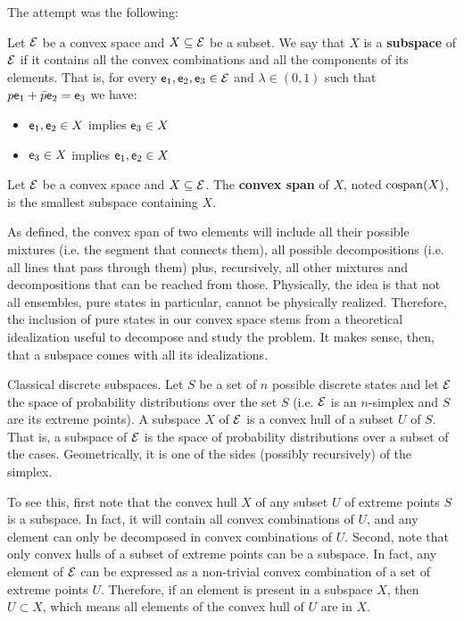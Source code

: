 The attempt was the following:

\begin{defn}
	Let $\mathcal{E}$ be a convex space and $X \subseteq \mathcal{E}$ be a subset. We say that $X$ is a \textbf{subspace} of $\mathcal{E}$ if it contains all the convex combinations and all the components of its elements. That is, for every $\mathsf{e}_1, \mathsf{e}_2, \mathsf{e}_3 \in \mathcal{E}$ and $\lambda \in (0,1)$ such that $p \mathsf{e}_1 + \bar{p} \mathsf{e}_2 = \mathsf{e}_3$ we have:
	\begin{itemize}
		\item $\mathsf{e}_1, \mathsf{e}_2 \in X$ implies $\mathsf{e}_3 \in X$
		\item $\mathsf{e}_3 \in X$ implies $\mathsf{e}_1, \mathsf{e}_2 \in X$
	\end{itemize}
\end{defn}

\begin{defn}
	Let $\mathcal{E}$ be a convex space and $X \subseteq \mathcal{E}$.  The \textbf{convex span} of $X$, noted $\mathrm{cospan}(X)$, is the smallest subspace containing $X$.
\end{defn}

\begin{remark}
	As defined, the convex span of two elements will include all their possible mixtures (i.e. the segment that connects them), all possible decompositions (i.e. all lines that pass through them) plus, recursively, all other mixtures and decompositions that can be reached from those. Physically, the idea is that not all ensembles, pure states in particular, cannot be physically realized. Therefore, the inclusion of pure states in our convex space stems from a theoretical idealization useful to decompose and study the problem. It makes sense, then, that a subspace comes with all its idealizations.
\end{remark}

\begin{example} Classical discrete subspaces.
	Let $S$ be a set of $n$ possible discrete states and let $\mathcal{E}$ the space of probability distributions over the set $S$ (i.e. $\mathcal{E}$ is an $n$-simplex and $S$ are its extreme points). A subspace $X$ of $\mathcal{E}$ is a convex hull of a subset $U$ of $S$. That is, a subspace of $\mathcal{E}$ is the space of probability distributions over a subset of the cases. Geometrically, it is one of the sides (possibly recursively) of the simplex.
	
	To see this, first note that the convex hull $X$ of any subset $U$ of extreme points $S$ is a subspace. In fact, it will contain all convex combinations of $U$, and any element can only be decomposed in convex combinations of $U$. Second, note that only convex hulls of a subset of extreme points can be a subspace. In fact, any element of $\mathcal{E}$ can be expressed as a non-trivial convex combination of a set of extreme points $U$. Therefore, if an element is present in a subspace $X$, then $U \subset X$, which means all elements of the convex hull of $U$ are in $X$.
\end{example}


